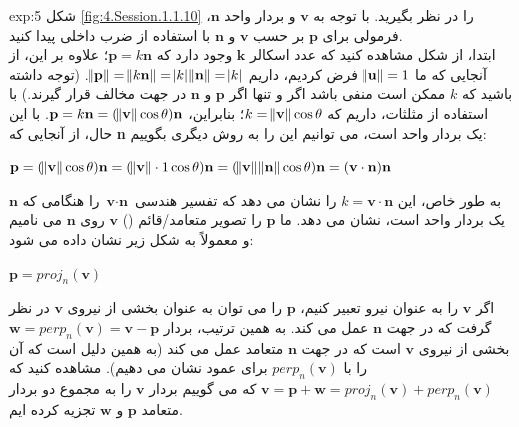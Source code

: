 {\begin{spacing}{1.5}
        \textbf{\vspace{-6pt}}
        \begin{example}{exp:5}
            شکل \ref{fig:4.Session.1.1.10} را در نظر بگیرید.
            با توجه به $\textbf{v}$ و بردار واحد $\textbf{n}$، فرمولی برای $\textbf{p}$ بر حسب $\textbf{v}$ و $\textbf{n}$ با استفاده از ضرب داخلی پیدا کنید. \\
            ابتدا، از شکل مشاهده کنید که عدد اسکالر $\textbf{k}$ وجود دارد
            که $\textbf{p}=k\textbf{n}$؛ علاوه بر این، از آنجایی که ما $\norm{\textbf{u}}=1$ فرض کردیم،
            داریم $\norm{\textbf{p}}=\norm{k\textbf{n}}=\abs{k}\norm{\textbf{n}}=\abs{k}$.
            (توجه داشته باشید که $k$ ممکن است منفی باشد اگر و تنها اگر $\textbf{p}$ و $\textbf{n}$ در جهت مخالف قرار گیرند.)
            با استفاده از مثلثات، داریم که $k=\norm{\textbf{v}}\cos\theta$؛
            بنابراین، $\textbf{p}=k\textbf{n}=(\norm{\textbf{v}}\cos\theta)\textbf{n}$.
            با این حال، از آنجایی که \textbf{n} یک بردار واحد است، می توانیم این را به روش دیگری بگوییم:

            \begin{center}
                $\textbf{p}=(\norm{\textbf{v}}\cos\theta)\textbf{n}=(\norm{\textbf{v}}\cdot 1\cos\theta)\textbf{n}=(\norm{\textbf{v}}\norm{\textbf{n}}\cos\theta)\textbf{n}=(\textbf{v}\cdot\textbf{n})\textbf{n}$
            \end{center}

            به طور خاص، این $k=\textbf{v}\cdot\textbf{n}$ را نشان می دهد که تفسیر هندسی $\textbf{v}\cdot\textbf{n}$ را هنگامی که $\textbf{n}$ یک بردار واحد است، نشان می دهد. ما $\textbf{p}$ را تصویر متعامد/قائم () $\textbf{v}$ روی $\textbf{n}$ می نامیم و معمولاً به شکل زیر نشان داده می شود:

            \begin{center}
                $\textbf{p}=proj_{n}(\textbf{v})$
            \end{center}

            اگر $\textbf{v}$ را به عنوان نیرو تعبیر کنیم، $\textbf{p}$ را می توان به عنوان بخشی از نیروی $\textbf{v}$ در نظر گرفت که در جهت $\textbf{n}$ عمل می کند.
            به همین ترتیب، بردار $\textbf{w}=perp_{n}(\textbf{v})=\textbf{v}-\textbf{p}$ بخشی از نیروی $\textbf{v}$ است که در جهت $\textbf{n}$ متعامد عمل می کند
            (به همین دلیل است که آن را با $perp_{n}(\textbf{v})$ برای عمود نشان می دهیم).
            مشاهده کنید که $\textbf{v}=\textbf{p}+\textbf{w}=proj_{n}(\textbf{v})+perp_{n}(\textbf{v})$ که می گوییم بردار $\textbf{v}$ را به مجموع دو بردار متعامد $\textbf{p}$ و $\textbf{w}$ تجزیه کرده ایم.


\end{example}
\end{spacing}}
